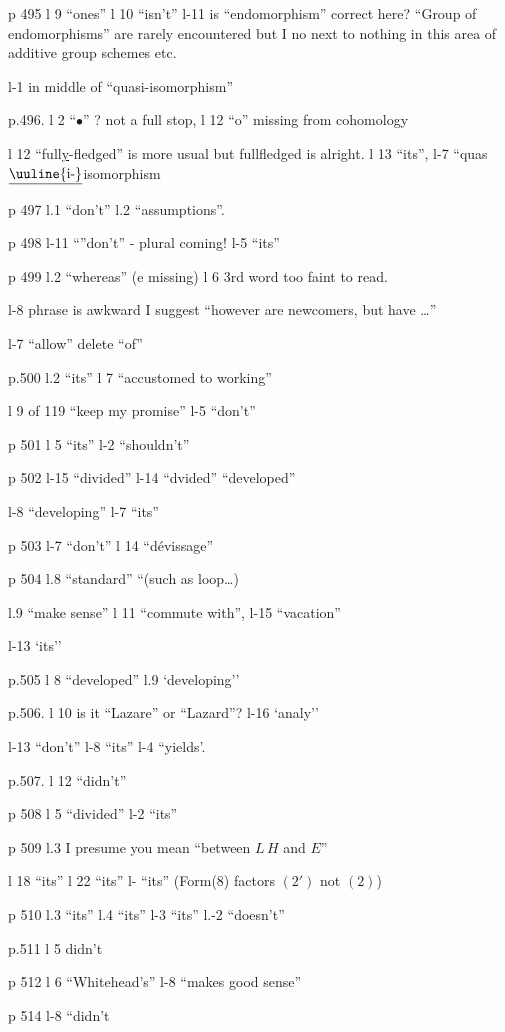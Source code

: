 
p 495 l 9 ``ones'' \quad l 10 ``isn't'' \quad l-11 is ``endomorphism'' correct here? ``Group of endomorphisms'' are rarely encountered but I no next to nothing in this area of additive group schemes etc.

l-1 \unsure{-|$\leftarrow$} in middle of ``quasi-isomorphism''

p.496. l 2 ``\(\bullet\)'' ? not a full stop, \quad l 12 ``o'' missing from cohomology

l 12 ``full\uline{y}-fledged'' is  more usual but fullfledged is alright. \quad l 13 ``its'', \quad l-7 ``quas$\underline{\text{\uuline{i-}}}$isomorphism

p 497 l.1 ``don't'' \quad l.2 ``assumptions''.

p 498 l-11 ``''don't'' - plural coming! \quad l-5 ``its''


p 499 l.2 ``whereas'' (e missing) \quad l 6 3rd word too faint to read.

l-8 phrase is awkward I suggest ``however are newcomers, but have \ldots{}''

l-7 ``allow'' delete ``of''

p.500 l.2 ``its'' \quad l 7 ``accustomed to working''

l 9 of 119 ``keep my promise'' \quad l-5 ``don't''

p 501 l 5 ``its'' \quad l-2 ``shouldn't''

p 502 l-15 ``divided'' \quad l-14 ``dvided'' ``developed''

l-8 ``developing'' \quad l-7 ``its''

p 503 l-7 ``don't'' \quad l 14 ``dévissage''

p 504 l.8 ``standard'' \quad ``(such as loop\ldots{})

l.9 ``make sense'' \quad l 11 ``commute with'', \quad l-15 ``vacation''

l-13 `its''

p.505 l 8 ``developed'' \quad l.9 `developing''

p.506. l 10 is it ``Lazare'' or ``Lazard''? \quad l-16 `analy''

l-13 ``don't'' \quad l-8 ``its'' \quad l-4 ``yields'.

p.507. l 12 ``didn't''

p 508 l 5 ``divided'' \quad l-2 ``its''

p 509 l.3 I presume you mean ``between $L\,H$ and $E$''

l 18 ``its'' \quad l 22 ``its'' \quad l- ``its'' \quad (Form(8) factors $(2')$ not $(2)$)

p 510 l.3 ``its'' \quad l.4 ``its'' \quad l-3 ``its'' \quad l.-2 ``doesn't''

p.511 l 5 didn't

p 512 l 6 ``Whitehead's'' \quad l-8 ``makes good sense''

p 514 l-8 ``didn't
